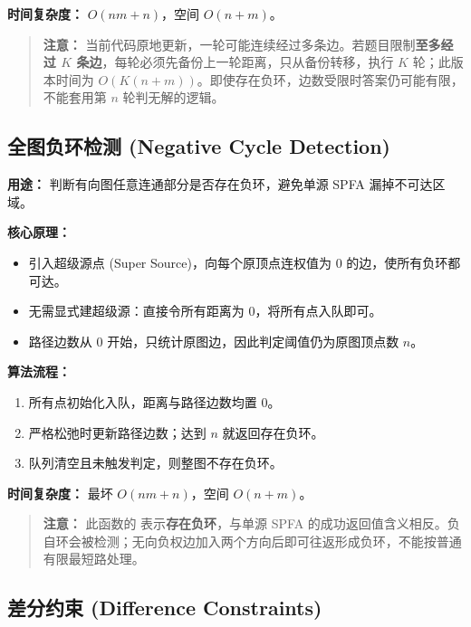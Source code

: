 \textbf{时间复杂度：} $O(nm+n)$，空间 $O(n+m)$。

\begin{quote}
\textbf{注意：} 当前代码原地更新，一轮可能连续经过多条边。若题目限制\textbf{至多经过 $K$ 条边}，每轮必须先备份上一轮距离，只从备份转移，执行 $K$ 轮；此版本时间为 $O(K(n+m))$。即使存在负环，边数受限时答案仍可能有限，不能套用第 $n$ 轮判无解的逻辑。
\end{quote}



\subsection{全图负环检测 (Negative Cycle Detection)}

\textbf{用途：} 判断有向图任意连通部分是否存在负环，避免单源 SPFA 漏掉不可达区域。

\textbf{核心原理：}
\begin{itemize}
  \item 引入超级源点 (Super Source)，向每个原顶点连权值为 $0$ 的边，使所有负环都可达。
  \item 无需显式建超级源：直接令所有距离为 $0$，将所有点入队即可。
  \item 路径边数从 $0$ 开始，只统计原图边，因此判定阈值仍为原图顶点数 $n$。
\end{itemize}

\textbf{算法流程：}
\begin{enumerate}
  \item 所有点初始化入队，距离与路径边数均置 $0$。
  \item 严格松弛时更新路径边数；达到 $n$ 就返回存在负环。
  \item 队列清空且未触发判定，则整图不存在负环。
\end{enumerate}

\textbf{时间复杂度：} 最坏 $O(nm+n)$，空间 $O(n+m)$。

\begin{quote}
\textbf{注意：} 此函数的  表示\textbf{存在负环}，与单源 SPFA 的成功返回值含义相反。负自环会被检测；无向负权边加入两个方向后即可往返形成负环，不能按普通有限最短路处理。
\end{quote}



\subsection{差分约束 (Difference Constraints)}

